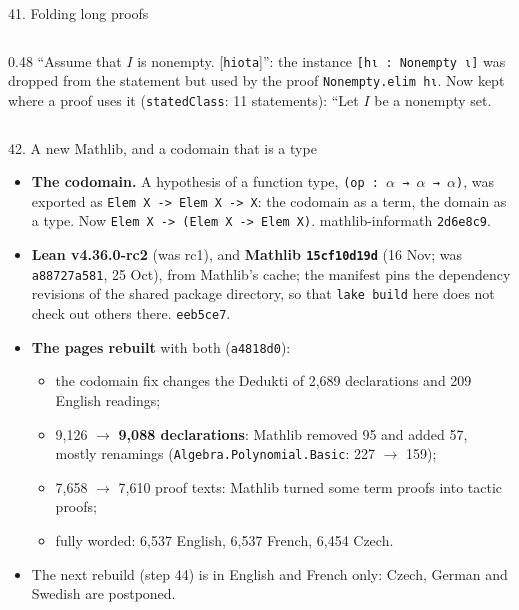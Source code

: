 \documentclass[10pt,aspectratio=169]{beamer}
\newcommand{\bad}[1]{\textcolor{warn}{#1}}
\newcommand{\ok}[1]{\textcolor{good}{#1}}
\newcommand{\commit}[1]{\texttt{\footnotesize #1}}
\begin{document}
\begin{frame}{41. Folding long proofs}
\begin{columns}[T]
\begin{column}{0.48\textwidth}
      \bad{``Assume that $I$ is nonempty. [\texttt{hiota}]''}: the instance
      \texttt{[hι : Nonempty ι]} was dropped from the statement but used by the proof
      \texttt{Nonempty.elim hι}. Now kept where a proof uses it (\texttt{statedClass}: 11 statements): ``Let $I$ be a nonempty set.
    \end{column}
  \end{columns}
\end{frame}

\begin{frame}[fragile]{42. A new Mathlib, and a codomain that is a type}
  \footnotesize
  \begin{itemize}
    \item \textbf{The codomain.} A hypothesis of a function type, \texttt{(op : $\alpha$ → $\alpha$ → $\alpha$)}, was
          exported as \bad{\texttt{Elem X -> Elem X -> X}}: the codomain as a term, the domain
          as a type. Now \ok{\texttt{Elem X -> (Elem X -> Elem X)}}.
          mathlib-informath \commit{2d6e8c9}.
    \item \textbf{Lean v4.36.0-rc2} (was rc1), and \textbf{Mathlib \commit{15cf10d19d}} (16 Nov;
          was \commit{a88727a581}, 25 Oct), from Mathlib's cache; the manifest pins the
          dependency revisions of the shared package directory, so that \texttt{lake build}
          here does not check out others there. \commit{eeb5ce7}.
    \item \textbf{The pages rebuilt} with both (\commit{a4818d0}):
      \begin{itemize}
        \item the codomain fix changes the Dedukti of 2,689 declarations and 209 English
              readings;
        \item 9,126 $\to$ \textbf{9,088 declarations}: Mathlib removed 95 and added 57, mostly
              renamings (\texttt{Algebra.Polynomial.Basic}: 227 $\to$ 159);
        \item 7,658 $\to$ 7,610 proof texts: Mathlib turned some term proofs into tactic proofs;
        \item fully worded: 6,537 English, 6,537 French, 6,454 Czech.
      \end{itemize}
    \item The next rebuild (step 44) is in English and French only: Czech, German and Swedish
          are postponed.
  \end{itemize}
\end{frame}
\end{document}
